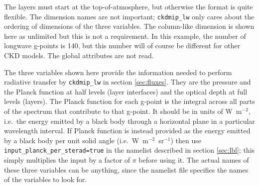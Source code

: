 \documentclass[twoside]{article}
\def\codesize{\small}
\def\code#1{{\codesize\texttt{#1}}}
\begin{document}
%
The layers must start at the top-of-atmosphere, but otherwise the
format is quite flexible.  The dimension names are not important;
\code{ckdmip\_lw} only cares about the ordering of dimensions of the
three variables. The column-like dimension is shown here as unlimited
but this is not a requirement. In this example, the number of longwave
g-points is 140, but this number will of course be different for other
CKD models. The global attributes are not read.

The three variables shown here provide the information needed to
perform radiative transfer by \code{ckdmip\_lw} in section
\ref{sec:fluxes}. They are the pressure and the Planck function at
half levels (layer interfaces) and the optical depth at full levels
(layers).  The Planck function for each g-point is the integral across
all parts of the spectrum that contribute to that g-point.  It should
be in units of W~m$^{-2}$, i.e.\ the energy emitted by a black body
through a horizontal plane in a particular wavelength interval.  If
Planck function is instead provided as the energy emitted by a black
body per unit solid angle (i.e.\ W~m$^{-2}$~sr$^{-1}$) then use
\code{input\_planck\_per\_sterad=true} in the namelist described in
section \ref{sec:lbl}; this simply multiplies the input by a factor of
$\pi$ before using it. The actual names of these three variables can
be anything, since the namelist file
specifies the names of the variables to look for.
\end{document}
